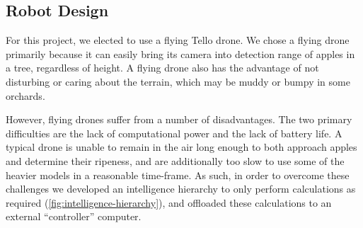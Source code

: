 \subsection{Robot Design}\label{subsec:robot-design}
For this project, we elected to use a flying Tello drone.
We chose a flying drone primarily because it can easily bring its camera into detection range of apples in a tree, regardless of height.
A flying drone also has the advantage of not disturbing or caring about the terrain, which may be muddy or bumpy in some orchards.

However, flying drones suffer from a number of disadvantages.
The two primary difficulties are the lack of computational power and the lack of battery life.
A typical drone is unable to remain in the air long enough to both approach apples and determine their ripeness, and are  additionally too slow to use some of the heavier models in a reasonable time-frame.
As such, in order to overcome these challenges we developed an intelligence hierarchy to only perform calculations as required (\autoref{fig:intelligence-hierarchy}), and offloaded these calculations to an external ``controller'' computer.

